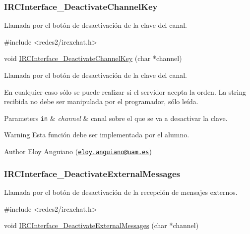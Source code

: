  \hypertarget{IRCInterface_DeactivateChannelKey}{}\subsubsection{I\-R\-C\-Interface\-\_\-\-Deactivate\-Channel\-Key}\label{IRCInterface_DeactivateChannelKey}
Llamada por el botón de desactivación de la clave del canal.


\begin{DoxyCode}
\textcolor{preprocessor}{#include <redes2/ircxchat.h>}

\textcolor{keywordtype}{void} \hyperlink{xchat2_8c_a3e67ee0cd384b524d57fda14593dce8e}{IRCInterface\_DeactivateChannelKey} (\textcolor{keywordtype}{char} *channel)
\end{DoxyCode}


Llamada por el botón de desactivación de la clave del canal.

En cualquier caso sólo se puede realizar si el servidor acepta la orden. La string recibida no debe ser manipulada por el programador, sólo leída.


\begin{DoxyParams}[1]{Parameters}
\mbox{\tt in}  & {\em channel} & canal sobre el que se va a desactivar la clave.\\
\hline
\end{DoxyParams}
\begin{DoxyWarning}{Warning}
Esta función debe ser implementada por el alumno.
\end{DoxyWarning}
\begin{DoxyAuthor}{Author}
Eloy Anguiano (\href{mailto:eloy.anguiano@uam.es}{\tt eloy.\-anguiano@uam.\-es})
\end{DoxyAuthor}


 \hypertarget{IRCInterface_DeactivateExternalMessages}{}\subsubsection{I\-R\-C\-Interface\-\_\-\-Deactivate\-External\-Messages}\label{IRCInterface_DeactivateExternalMessages}
Llamada por el botón de desactivación de la recepción de mensajes externos.


\begin{DoxyCode}
\textcolor{preprocessor}{#include <redes2/ircxchat.h>}

\textcolor{keywordtype}{void} \hyperlink{xchat2_8c_a638b1535f4ecbc9a6affb2df2a6a946e}{IRCInterface\_DeactivateExternalMessages} (\textcolor{keywordtype}{char} *channel)
\end{DoxyCode}


